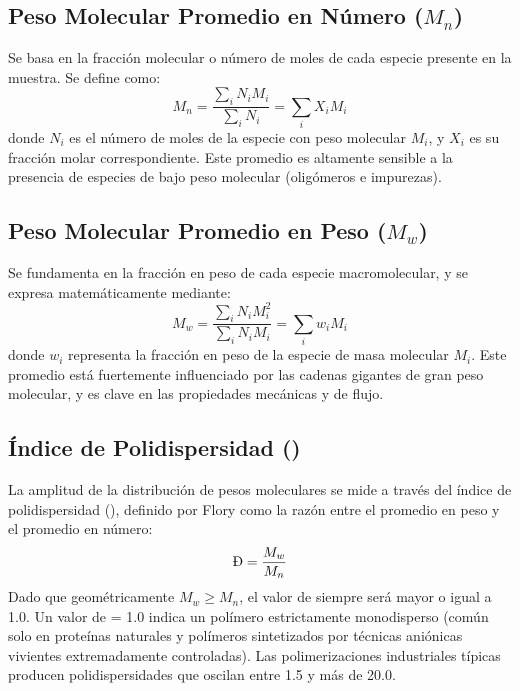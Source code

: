 \subsection{Peso Molecular Promedio en Número ($M_n$)}
Se basa en la fracción molecular o número de moles de cada especie presente en la muestra. Se define como:
\begin{equation}
    M_n = \frac{\sum_i N_i M_i}{\sum_i N_i} = \sum_i X_i M_i
    \label{eq:mn}
\end{equation}
donde $N_i$ es el número de moles de la especie con peso molecular $M_i$, y $X_i$ es su fracción molar correspondiente. Este promedio es altamente sensible a la presencia de especies de bajo peso molecular (oligómeros e impurezas).

\subsection{Peso Molecular Promedio en Peso ($M_w$)}
Se fundamenta en la fracción en peso de cada especie macromolecular, y se expresa matemáticamente mediante:
\begin{equation}
    M_w = \frac{\sum_i N_i M_i^2}{\sum_i N_i M_i} = \sum_i w_i M_i
    \label{eq:mw}
\end{equation}
donde $w_i$ representa la fracción en peso de la especie de masa molecular $M_i$. Este promedio está fuertemente influenciado por las cadenas gigantes de gran peso molecular, y es clave en las propiedades mecánicas y de flujo.

\subsection{Índice de Polidispersidad (\text{\DJ})}
La amplitud de la distribución de pesos moleculares se mide a través del índice de polidispersidad (\text{\DJ}), definido por Flory \cite{flory1953principles} como la razón entre el promedio en peso y el promedio en número:
\begin{equation}
    \text{\DJ} = \frac{M_w}{M_n}
    \label{eq:pdi}
\end{equation}
Dado que geométricamente $M_w \ge M_n$, el valor de \text{\DJ} siempre será mayor o igual a 1.0. Un valor de \text{\DJ} = 1.0 indica un polímero estrictamente monodisperso (común solo en proteínas naturales y polímeros sintetizados por técnicas aniónicas vivientes extremadamente controladas). Las polimerizaciones industriales típicas producen polidispersidades que oscilan entre 1.5 y más de 20.0.

